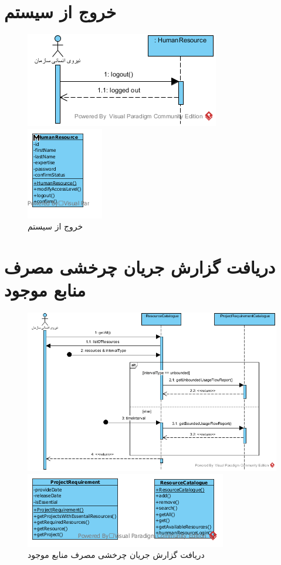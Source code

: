 \section{خروج از سیستم}
\begin{figure}[H]
	\centering
	\includegraphics[scale=1]{img/sequence-analysis/SignOut}
	
	
	\includegraphics[scale=1]{img/sequence-analysis/SignOutC}
	\caption{خروج از سیستم}
\end{figure}


\section{دریافت گزارش جریان چرخشی مصرف منابع موجود}
\begin{figure}[H]
	\centering
	\includegraphics[scale=0.8]{img/sequence-analysis/UsageFlowReport}
	
	
	\includegraphics[scale=1]{img/sequence-analysis/UsageFlowReportC}
	\caption{دریافت گزارش جریان چرخشی مصرف منابع موجود}
\end{figure}

